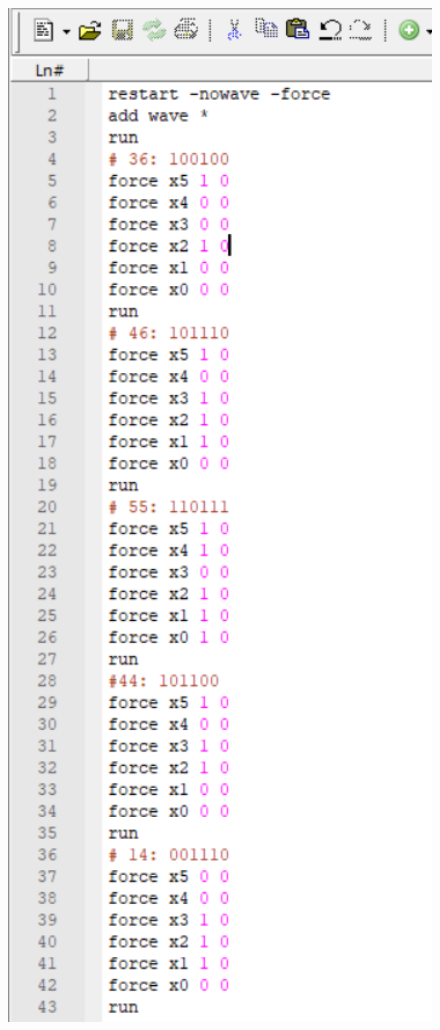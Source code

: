 \documentclass[]{article}
\begin{document}
\begin{minipage}{0.5\textwidth}
\begin{figure}[H]
	\centering
	\includegraphics[width=1\textwidth]{test_f3_1.png}
\end{figure}
\end{minipage}
\end{document}
